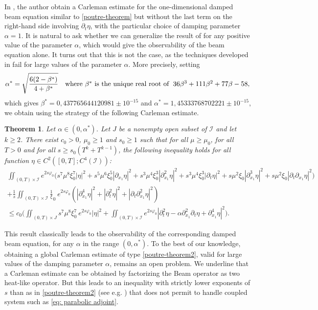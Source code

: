 \documentclass[a4paper, 12pt]{article}
\theoremstyle{plain}
\newtheorem{theorem}{Theorem}[section]
\theoremstyle{definition}
\numberwithin{theorem}{section}
\numberwithin{equation}{section}
\begin{document}
In \cite{Sourav}, the author obtain a Carleman estimate for the one-dimensional damped beam equation similar to \eqref{poutre-theorem} but without the last term on the right-hand side involving $\partial_t \eta$, with the particular choice of damping parameter $\alpha = 1$. It is natural to ask whether we can generalize the result of \cite{Sourav} for any positive value of the parameter $\alpha$, which would give the observability of the beam equation alone. It turns out that this is not the case, as the techniques developed in \cite{Sourav} fail for large values of the parameter $\alpha$. More precisely, setting
\begin{equation}\label{DefAlphastar}
\alpha^*=\sqrt{\frac{6(2-\beta^*)}{4+\beta^*}}\quad \mbox{where $\beta^*$ is the unique real root of $ \;36\beta^3+111\beta^2+77\beta-58$},
\end{equation}
which gives $\beta^* =  0,437765644120981\pm 10^{-15}$ and $\alpha^*=1,45333768702221\pm 10^{-15}$, we obtain using the strategy of \cite{Sourav} the following Carleman estimate.
\begin{theorem}\label{poutre3}
 Let $\alpha\in (0,\alpha^*)$. Let $J$ be a nonempty open subset of $\mathcal{I}$ and let $k\geq 2$. There exist $c_0>0$, $\mu_0\geq 1$ and $s_0\geq 1$ such that for all $\mu\geq\mu_0$, for all $T>0$ and for all $s\geq s_0(T^k+T^{k-1})$, the following inequality holds for all function $\eta\in C^2([0,T];C^4(\mathcal{I}))$:
\begin{multline}\label{poutre-theorem2}
\iint_{(0,T)\times\mathcal{I}}e^{2s\varphi_0}\Big(s^7\mu^8\xi^7_0|\eta|^2+s^5\mu^6\xi_0^5|\partial_{x_1}\eta|^2+s^3\mu^4\xi_0^3|\partial^2_{x_1}\eta|^2+s^3\mu^4\xi_0^3|\partial_t\eta|^2+s\mu^2\xi_0|\partial^3_{x_1}\eta|^2+s\mu^2\xi_0|\partial_t\partial_{x_1}\eta|^2\Big)\\
+
\frac1s\iint_{(0,T)\times\mathcal{I}}\frac1\xi_0~e^{2s\varphi_0}(|\partial^4_{x_1}\eta|^2+|\partial^2_t\eta|^2+|\partial_t\partial^2_{x_1}\eta|^2)\\
\leq c_0\Big(\iint_{(0,T)\times J}s^7\mu^8\xi^7_0~e^{2s\varphi_0}|\eta|^2+\iint_{(0,T)\times\mathcal{I}}e^{2s\varphi_0}|\partial^2_t\eta-\alpha\partial^2_{x_1}\partial_t\eta+\partial^4_{x_1}\eta|^2\Big).
\end{multline} 
\end{theorem}

This result classically leads to the observability of the corresponding damped beam equation, for any $\alpha$ in the range $(0,\alpha^*)$. To the best of our knowledge, 
obtaining a global Carleman estimate of type \eqref{poutre-theorem2}, valid for large values of the damping parameter $\alpha$, remains an open problem. We underline that a Carleman estimate can be obtained by factorizing the Beam operator as two heat-like operator. But this leads to an inequality with strictly lower exponents of $s$ than as in \eqref{poutre-theorem2} (see e.g. \cite{Fu2020}) that does not permit to handle coupled system such as \eqref{eq: parabolic adjoint}. 
\end{document}
